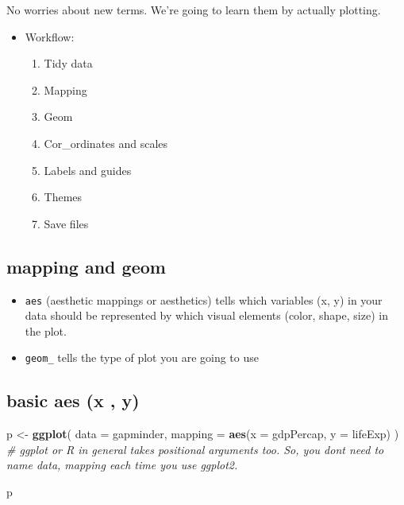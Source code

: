 \documentclass[
]{book}
\newenvironment{Shaded}{\begin{snugshade}}{\end{snugshade}}
\newcommand{\AttributeTok}[1]{\textcolor[rgb]{0.13,0.29,0.53}{#1}}
\newcommand{\CommentTok}[1]{\textcolor[rgb]{0.56,0.35,0.01}{\textit{#1}}}
\newcommand{\FunctionTok}[1]{\textcolor[rgb]{0.13,0.29,0.53}{\textbf{#1}}}
\newcommand{\NormalTok}[1]{#1}
\newcommand{\OtherTok}[1]{\textcolor[rgb]{0.56,0.35,0.01}{#1}}
\providecommand{\tightlist}{%
  \setlength{\itemsep}{0pt}\setlength{\parskip}{0pt}}
\begin{document}
No worries about new terms. We're going to learn them by actually plotting.

\begin{itemize}
\item
  Workflow:

  \begin{enumerate}
  \def\labelenumi{\arabic{enumi}.}
  \tightlist
  \item
    Tidy data
  \item
    Mapping
  \item
    Geom
  \item
    Cor\_ordinates and scales
  \item
    Labels and guides
  \item
    Themes
  \item
    Save files
  \end{enumerate}
\end{itemize}

\subsection{mapping and geom}\label{mapping-and-geom}

\begin{itemize}
\item
  \texttt{aes} (aesthetic mappings or aesthetics) tells which variables (x, y) in your data should be represented by which visual elements (color, shape, size) in the plot.
\item
  \texttt{geom\_} tells the type of plot you are going to use
\end{itemize}

\subsection{basic aes (x , y)}\label{basic-aes-x-y}

\begin{Shaded}
\begin{Highlighting}[]
\NormalTok{p }\OtherTok{\textless{}{-}} \FunctionTok{ggplot}\NormalTok{(}
  \AttributeTok{data =}\NormalTok{ gapminder,}
  \AttributeTok{mapping =} \FunctionTok{aes}\NormalTok{(}\AttributeTok{x =}\NormalTok{ gdpPercap, }\AttributeTok{y =}\NormalTok{ lifeExp)}
\NormalTok{) }\CommentTok{\# ggplot or R in general takes positional arguments too. So, you don\textquotesingle{}t need to name data, mapping each time you use ggplot2.}

\NormalTok{p}
\end{Highlighting}
\end{Shaded}
\end{document}
